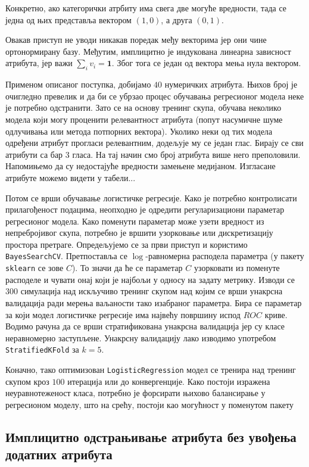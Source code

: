 \documentclass[12pt, a4paper]{article}
\begin{document}
	Конкретно, ако категорички атрбиту има свега две могуће вредности, тада се једна од њих представља вектором $(1, 0)$, а друга $(0, 1)$.

	Овакав приступ не уводи никакав поредак међу векторима јер они чине ортонормирану базу. Међутим, имплицитно је индукована линеарна зависност атрибута, јер важи $\sum_{i} v_i = \textbf{1}$. Због тога се један од вектора мења нула вектором.

	Применом описаног поступка, добијамо $40$ нумеричких атрибута. Њихов број је очигледно превелик и да би се убрзао процес обучавања регресионог модела неке је потребно одстранити. Зато се на основу тренинг скупа, обучава неколико модела који могу проценити релевантност атрибута (попут насумичне шуме одлучивања или метода потпорних вектора). Уколико неки од тих модела одређени атрибут прогласи релевантним, додељује му се један глас. Бирају се сви атрибути са бар $3$ гласа. На тај начин смо број атрибута више него преполовили. Напомињемо да су недостајуће вредности замењене медијаном. Изгласане атрибуте можемо видети у табели...

	Потом се врши обучавање логистичке регресије. Како је потребно контролисати прилагођеност подацима, неопходно је одредити регуларизациони параметар регресионог модела. Како поменути параметар може узети вредност из непребројивог скупа, потребно је вршити узорковање или дискретизацију простора претраге. Опредељујемо се за први приступ и користимо \texttt{BayesSearchCV}. Претпоставља се $\log$-равномерна расподела параметра (у пакету \texttt{sklearn} се зове $C$). То значи да ће се параметар $C$ узорковати из поменуте расподеле и чувати онај који је најбољи у односу на задату метрику. Изводи се $300$ симулација над искључиво тренинг скупом над којим се врши унакрсна валидација ради мерења ваљаности тако изабраног параметра. Бира се параметар за који модел логистичке регресије има највећу површину испод $ROC$ криве. Водимо рачуна да се врши стратификована унакрсна валидација јер су класе неравномерно заступљене. Унакрсну валидацију лако изводимо употребом \texttt{StratifiedKFold} за $k=5$.

	Коначно, тако оптимизован \texttt{LogisticRegression} модел се тренира над тренинг скупом кроз $100$ итерација или до конвергенције. Како постоји изражена неуравнотеженост класа, потребно је форсирати њихово балансирање у регресионом моделу, што на срећу, постоји као могућност у поменутом пакету
	
	\subsection{Имплицитно одстрањивање атрибута без увођења додатних атрибута} \label{app:2}
	
\end{document}
